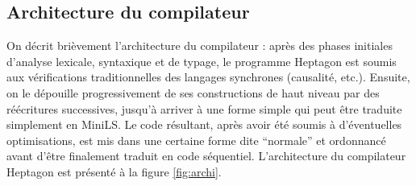 \documentclass[a4paper]{article}
\newcommand{\LANG}{Heptagon}
\begin{document}
\subsection{Architecture du compilateur}

On d\'ecrit bri\`evement l'architecture du compilateur : apr\`es des phases initiales
d'analyse lexicale, syntaxique et de typage, le programme \LANG{} est soumis aux
v\'erifications traditionnelles des langages synchrones (causalit\'e,
etc.). Ensuite, on le d\'epouille progressivement de ses constructions de haut
niveau par des r\'e\'ecritures successives, jusqu'\`a arriver \`a une forme simple qui
peut \^etre traduite simplement en MiniLS. Le code r\'esultant, apr\`es avoir \'et\'e
soumis \`a d'\'eventuelles optimisations, est mis dans une certaine forme dite
``normale'' et ordonnanc\'e avant d'\^etre finalement traduit en code
s\'equentiel. L'architecture du compilateur \LANG{} est pr\'esent\'e \`a la figure
\ref{fig:archi}.

\end{document}
